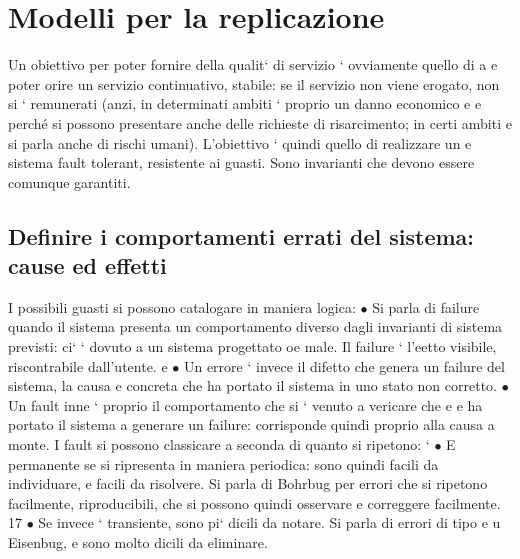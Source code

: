 \documentclass[a4paper,12pt]{article}
\begin{document}
\section{Modelli per la replicazione}
Un obiettivo per poter fornire della qualit` di servizio ` ovviamente quello di
a
e
poter orire un servizio continuativo, stabile: se il servizio non viene erogato,
non si ` remunerati (anzi, in determinati ambiti ` proprio un danno economico
e
e
perché si possono presentare anche delle richieste di risarcimento; in certi ambiti
e
si parla anche di rischi umani). L'obiettivo ` quindi quello di realizzare un
e
sistema fault tolerant, resistente ai guasti. Sono invarianti che devono essere
comunque garantiti.
\subsection{Definire i comportamenti errati del sistema: cause ed effetti}
I possibili guasti si possono catalogare in maniera logica:
$\bullet$ Si parla di failure quando il sistema presenta un comportamento diverso
dagli invarianti di sistema previsti: ci` ` dovuto a un sistema progettato
oe
male. Il failure ` l'eetto visibile, riscontrabile dall'utente.
e
$\bullet$ Un errore ` invece il difetto che genera un failure del sistema, la causa
e
concreta che ha portato il sistema in uno stato non corretto.
$\bullet$ Un fault inne ` proprio il comportamento che si ` venuto a vericare che
e
e
ha portato il sistema a generare un failure: corrisponde quindi proprio alla
causa a monte.
I fault si possono classicare a seconda di quanto si ripetono:
`
$\bullet$ E permanente se si ripresenta in maniera periodica: sono quindi facili
da individuare, e facili da risolvere. Si parla di Bohrbug per errori che
si ripetono facilmente, riproducibili, che si possono quindi osservare e
correggere facilmente.
17
$\bullet$ Se invece ` transiente, sono pi` dicili da notare. Si parla di errori di tipo
e
u
Eisenbug, e sono molto dicili da eliminare.
\end{document}

